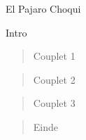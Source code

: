 \begin{song}[huayno]{El Pajaro Choqui}

\begin{instrumental}{Intro}
\measure{} \measure{} \measure{} \measure{} \measure{} \measure{} \measure{} \measure{}
\measure{} \measure{} \measure{} \measure{} \measure{} \measure{} \measure{} \measure{}
\end{instrumental}

\begin{verse}{Couplet 1}
\end{verse}

\begin{verse}{Couplet 2}
\end{verse}

\begin{verse}{Couplet 3}
\end{verse}

\begin{verse}{Einde}
\end{verse}
\end{song}

\clearpage
\begin{translation}[]

\end{translation}
